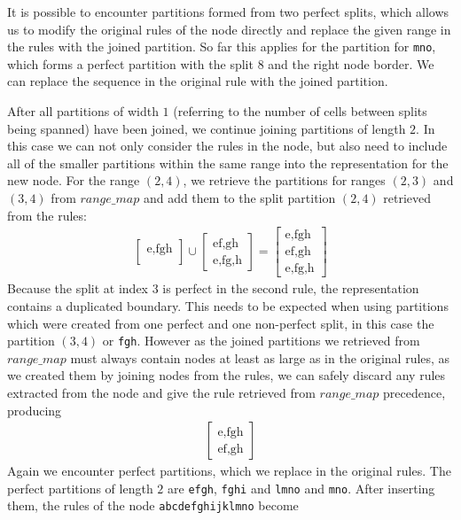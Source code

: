 It is possible to encounter partitions formed from two perfect splits, which allows us to modify the original rules of the node directly and replace the given range in the rules with the joined partition. So far this applies for the partition for \texttt{mno}, which forms a perfect partition with the split $8$ and the right node border. We can replace the sequence in the original rule with the joined partition.

After all partitions of width $1$ (referring to the number of cells between
splits being spanned) have been joined, we continue joining partitions of length $2$. In this case we can not only consider the rules in the node, but also need to include all of the smaller partitions within the same range into the representation for the new node. For the range $(2, 4)$, we retrieve the partitions for ranges $(2,3)$ and $(3,4)$ from $range\_map$ and add them to the split partition $(2,4)$ retrieved from the rules:
{
    \ttfamily
    \noindent
    \begin{align*}
        \begin{bmatrix}
            \text{e,fgh}\\
        \end{bmatrix}
        \cup
        \begin{bmatrix}
            \text{ef,gh}\\
            \text{e,fg,h}
        \end{bmatrix}
        =
        \begin{bmatrix}
            \text{e,fgh}\\
            \text{ef,gh}\\
            \text{e,fg,h}
        \end{bmatrix}
    \end{align*}
}
\noindent Because the split at index $3$ is perfect in the second rule, the representation contains a duplicated boundary. This needs to be expected when using partitions which were created from one perfect and one non-perfect split, in this case the partition $(3,4)$ or \texttt{fgh}. However as the joined partitions we retrieved from $range\_map$ must always contain nodes at least as large as in the original rules, as we created them by joining nodes from the rules, we can safely discard any rules extracted from the node and give the rule retrieved from $range\_map$ precedence, producing 
{
    \ttfamily
    \noindent
    \begin{align*}
        \begin{bmatrix}
            \text{e,fgh}\\
            \text{ef,gh}
        \end{bmatrix}
    \end{align*}
}
Again we encounter perfect partitions, which we replace in the original rules. The perfect partitions of length $2$ are \texttt{efgh}, \texttt{fghi} and \texttt{lmno} and \texttt{mno}. After inserting them, the rules of the node \texttt{abcdefghijklmno} become

